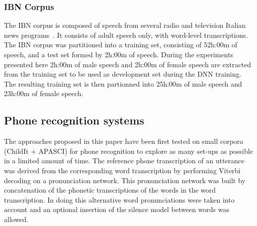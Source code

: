 \documentclass{nle}
\begin{document}
\subsubsection{IBN Corpus}
The IBN corpus is composed of speech from several radio and television
Italian news programs~\citep{GerGiuBru09}. It consists of adult speech
only, with word-level transcriptions. The IBN corpus was  partitioned into a training set, consisting
of 52h:00m of speech, and a test set formed by 2h:00m of speech. During the experiments presented here 2h:00m of male speech and 2h:00m of female speech are extracted from the training set to be used as development set during the DNN training. The resulting training set is then partionned into 25h:00m of male speech and 23h:00m of female speech.


\subsection{Phone recognition systems}
The approaches proposed in this paper have been first tested on small
corpora (ChildIt + APASCI) for phone recognition to explore as many
set-ups as possible in a limited amount of time.  The
reference phone transcription of an utterance was derived from the
corresponding word transcription by performing Viterbi decoding on a
pronunciation network.  This pronunciation network was built by
concatenation of the phonetic transcriptions of the words in the word
transcription.  In doing this alternative word pronunciations were
taken into account and an optional insertion of the silence model
between words was allowed.
\end{document}
